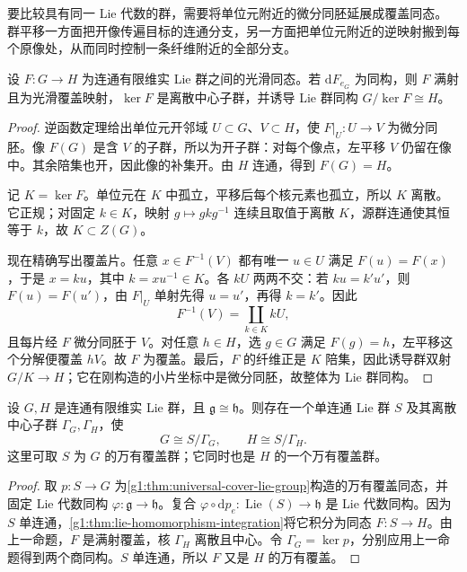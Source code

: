 要比较具有同一 Lie 代数的群，需要将单位元附近的微分同胚延展成覆盖同态。群平移一方面把开像传遍目标的连通分支，另一方面把单位元附近的逆映射搬到每个原像处，从而同时控制一条纤维附近的全部分支。

\begin{proposition}
	\label{g1:prop:lie-homomorphism-local-isomorphism}
	设 \(F:G\to H\) 为连通有限维实 Lie 群之间的光滑同态。若 \(\mathrm{d}F_{e_G}\) 为同构，则 \(F\) 满射且为光滑覆盖映射，\(\ker F\) 是离散中心子群，并诱导 Lie 群同构 \(G/\ker F\cong H\)。
\end{proposition}
\begin{proof}
	逆函数定理给出单位元开邻域 \(U\subset G\)、\(V\subset H\)，使 \(F|_U:U\to V\) 为微分同胚。像 \(F(G)\) 是含 \(V\) 的子群，所以为开子群：对每个像点，左平移 \(V\) 仍留在像中。其余陪集也开，因此像的补集开。由 \(H\) 连通，得到 \(F(G)=H\)。

	记 \(K=\ker F\)。单位元在 \(K\) 中孤立，平移后每个核元素也孤立，所以 \(K\) 离散。它正规；对固定 \(k\in K\)，映射 \(g\mapsto gkg^{-1}\) 连续且取值于离散 \(K\)，源群连通使其恒等于 \(k\)，故 \(K\subset Z(G)\)。

	现在精确写出覆盖片。任意 \(x\in F^{-1}(V)\) 都有唯一 \(u\in U\) 满足 \(F(u)=F(x)\)，于是 \(x=ku\)，其中 \(k=xu^{-1}\in K\)。各 \(kU\) 两两不交：若 \(ku=k'u'\)，则 \(F(u)=F(u')\)，由 \(F|_U\) 单射先得 \(u=u'\)，再得 \(k=k'\)。因此
	\[
		F^{-1}(V)=\coprod_{k\in K}kU,
	\]
	且每片经 \(F\) 微分同胚于 \(V\)。对任意 \(h\in H\)，选 \(g\in G\) 满足 \(F(g)=h\)，左平移这个分解便覆盖 \(hV\)。故 \(F\) 为覆盖。最后，\(F\) 的纤维正是 \(K\) 陪集，因此诱导群双射 \(G/K\to H\)；它在刚构造的小片坐标中是微分同胚，故整体为 Lie 群同构。
\end{proof}

\begin{corollary}
	\label{g1:cor:connected-groups-same-lie-algebra}
	设 \(G,H\) 是连通有限维实 Lie 群，且 \(\mathfrak g\cong\mathfrak h\)。则存在一个单连通 Lie 群 \(S\) 及其离散中心子群 \(\Gamma_G,\Gamma_H\)，使
	\[
		G\cong S/\Gamma_G,\qquad H\cong S/\Gamma_H.
	\]
	这里可取 \(S\) 为 \(G\) 的万有覆盖群；它同时也是 \(H\) 的一个万有覆盖群。
\end{corollary}
\begin{proof}
	取 \(p:S\to G\) 为\cref{g1:thm:universal-cover-lie-group}构造的万有覆盖同态，并固定 Lie 代数同构 \(\varphi:\mathfrak g\to\mathfrak h\)。复合 \(\varphi\circ\mathrm{d}p_e:\operatorname{Lie}(S)\to\mathfrak h\) 是 Lie 代数同构。因为 \(S\) 单连通，\cref{g1:thm:lie-homomorphism-integration}将它积分为同态 \(F:S\to H\)。由上一命题，\(F\) 是满射覆盖，核 \(\Gamma_H\) 离散且中心。令 \(\Gamma_G=\ker p\)，分别应用上一命题得到两个商同构。\(S\) 单连通，所以 \(F\) 又是 \(H\) 的万有覆盖。
\end{proof}

